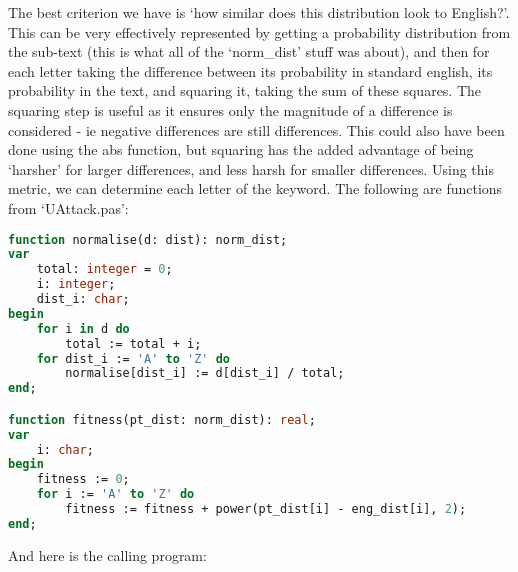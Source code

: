 \documentclass{article}
\begin{document}
    The best criterion we have is `how similar does this distribution look to
    English?'. This can be very effectively represented by getting a
    probability distribution from the sub-text (this is what all of the
    `norm\_dist' stuff was about), and then for each letter taking the
    difference between its probability in standard english, its probability in
    the text, and squaring it, taking the sum of these squares. The squaring
    step is useful as it ensures only the magnitude of a difference is
    considered - ie negative differences are still differences. This could also
    have been done using the abs function, but squaring has the added advantage
    of being `harsher' for larger differences, and less harsh for smaller
    differences. Using this metric, we can determine each letter of the
    keyword. The following are functions from `UAttack.pas':

\begin{lstlisting}[language=Pascal, caption=Fitness library functions]
function normalise(d: dist): norm_dist;
var
    total: integer = 0;
    i: integer;
    dist_i: char;
begin
    for i in d do
        total := total + i;
    for dist_i := 'A' to 'Z' do
        normalise[dist_i] := d[dist_i] / total;
end;

function fitness(pt_dist: norm_dist): real;
var
    i: char;
begin
    fitness := 0;
    for i := 'A' to 'Z' do
        fitness := fitness + power(pt_dist[i] - eng_dist[i], 2);
end;
\end{lstlisting}

    And here is the calling program:
\end{document}
